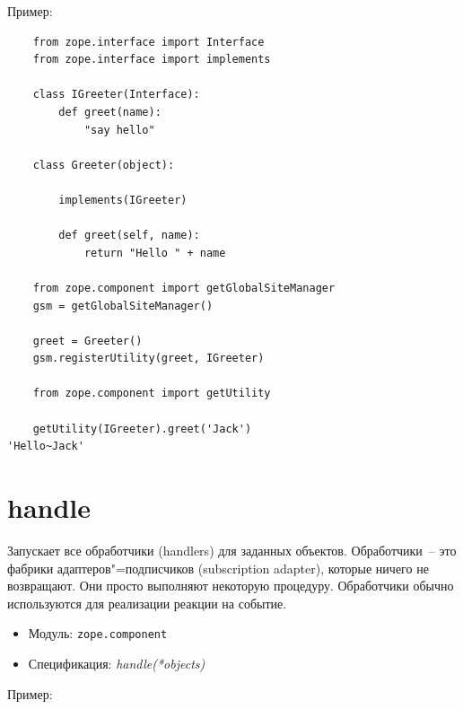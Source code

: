 \documentclass[a4paper,openany,twoside,final]{book}
\providecommand*{\DUroletitlereference}[1]{\textsl{#1}}
\begin{document}
Пример:

\begin{verbatim}
    from zope.interface import Interface
    from zope.interface import implements

    class IGreeter(Interface):
        def greet(name):
            "say hello"

    class Greeter(object):

        implements(IGreeter)

        def greet(self, name):
            return "Hello " + name

    from zope.component import getGlobalSiteManager
    gsm = getGlobalSiteManager()

    greet = Greeter()
    gsm.registerUtility(greet, IGreeter)

    from zope.component import getUtility

    getUtility(IGreeter).greet('Jack')
'Hello~Jack'
\end{verbatim}


\section*{handle%
  \label{handle}%
}

Запускает все обработчики (handlers) для заданных объектов.  Обработчики~-- это фабрики адаптеров"=подписчиков (subscription adapter), которые ничего не возвращают.  Они просто выполняют некоторую процедуру.  Обработчики обычно используются для реализации реакции на событие.

\begin{itemize}

\item Модуль: \texttt{zope.component}

\item Спецификация: \DUroletitlereference{handle(*objects)}

\end{itemize}

Пример:
\end{document}
